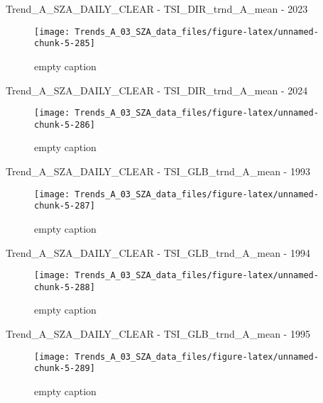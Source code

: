 \documentclass[
  10pt,
  a4paper,oneside]{article}
\begin{document}
Trend\_A\_SZA\_DAILY\_CLEAR - TSI\_DIR\_trnd\_A\_mean - 2023

\begin{figure}[!ht]

{\centering \texttt{[image: Trends\_A\_03\_SZA\_data\_files/figure-latex/unnamed-chunk-5-285]} 

}

\caption{ empty caption }\label{fig:unnamed-chunk-5-285}
\end{figure}

Trend\_A\_SZA\_DAILY\_CLEAR - TSI\_DIR\_trnd\_A\_mean - 2024

\begin{figure}[!ht]

{\centering \texttt{[image: Trends\_A\_03\_SZA\_data\_files/figure-latex/unnamed-chunk-5-286]} 

}

\caption{ empty caption }\label{fig:unnamed-chunk-5-286}
\end{figure}

Trend\_A\_SZA\_DAILY\_CLEAR - TSI\_GLB\_trnd\_A\_mean - 1993

\begin{figure}[!ht]

{\centering \texttt{[image: Trends\_A\_03\_SZA\_data\_files/figure-latex/unnamed-chunk-5-287]} 

}

\caption{ empty caption }\label{fig:unnamed-chunk-5-287}
\end{figure}

Trend\_A\_SZA\_DAILY\_CLEAR - TSI\_GLB\_trnd\_A\_mean - 1994

\begin{figure}[!ht]

{\centering \texttt{[image: Trends\_A\_03\_SZA\_data\_files/figure-latex/unnamed-chunk-5-288]} 

}

\caption{ empty caption }\label{fig:unnamed-chunk-5-288}
\end{figure}

Trend\_A\_SZA\_DAILY\_CLEAR - TSI\_GLB\_trnd\_A\_mean - 1995

\begin{figure}[!ht]

{\centering \texttt{[image: Trends\_A\_03\_SZA\_data\_files/figure-latex/unnamed-chunk-5-289]} 

}

\caption{ empty caption }\label{fig:unnamed-chunk-5-289}
\end{figure}
\end{document}
